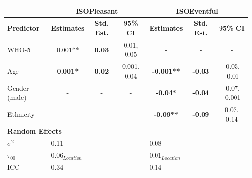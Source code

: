 \begin{landscape}
\begin{table}[hp]
    \begin{tabular}{@{}lcccccc@{}}
      \toprule
                         & \multicolumn{3}{c|}{\textbf{ISOPleasant}} & \multicolumn{3}{c}{\textbf{ISOEventful}}                                                                                                      \\
      \midrule
      \textbf{Predictor} & \textbf{Estimates}                        & \textbf{Std. Est.}                       & \multicolumn{1}{c|}{\textbf{95\% CI}} & \textbf{Estimates} & \textbf{Std. Est.} & \textbf{95\% CI} \\
      WHO-5              & 0.001**                                   & \textbf{0.03}                            & \multicolumn{1}{c|}{0.01, 0.05}       & -                  & -                  & -                \\
      Age                & \textbf{0.001*}                           & \textbf{0.02}                            & \multicolumn{1}{c|}{0.001, 0.04}      & \textbf{-0.001**}  & \textbf{-0.03}     & -0.05, -0.01     \\
      Gender (male)      & -                                         & -                                        & \multicolumn{1}{c|}{-}                & \textbf{-0.04*}    & \textbf{-0.04}     & -0.07, -0.001    \\
      Ethnicity          & -                                         & -                                        & \multicolumn{1}{c|}{-}                & \textbf{-0.09**}   & \textbf{-0.09}     & 0.03, 0.14       \\
      \midrule
      \multicolumn{7}{l}{\textbf{Random Effects}}                                                                                                                                                                    \\
      \midrule
      $\sigma^2$         & \multicolumn{3}{l|}{0.11}                 & \multicolumn{3}{l}{0.08}                                                                                                                      \\
      $\tau_{00}$        & \multicolumn{3}{l|}{0.06$_{Location}$}    & \multicolumn{3}{l}{0.01$_{Location}$}                                                                                                         \\
      ICC                & \multicolumn{3}{l|}{0.34}                 & \multicolumn{3}{l}{0.14}                                                                                                                      \\

\end{tabular}
\end{table}
\end{landscape}
